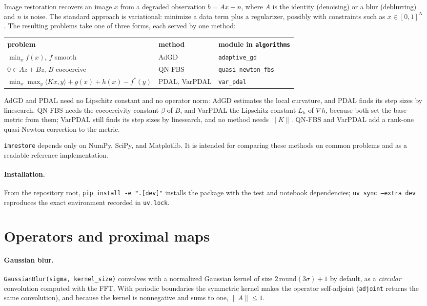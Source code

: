 \documentclass[11pt,a4paper]{article}
\newcommand{\code}[1]{\texttt{#1}}
\begin{document}
Image restoration recovers an image $x$ from a degraded observation
$b = Ax + n$, where $A$ is the identity (denoising) or a blur (deblurring)
and $n$ is noise. The standard approach is variational: minimize a data term
plus a regularizer, possibly with constraints such as $x\in[0,1]^N$. The
resulting problems take one of three forms, each served by one method:
\begin{center}
\begin{tabular}{lll}
\toprule
problem & method & module in \code{algorithms} \\
\midrule
$\min_x f(x)$, $f$ smooth & AdGD & \code{adaptive\_gd} \\
$0\in Az+Bz$, $B$ cocoercive & QN-FBS & \code{quasi\_newton\_fbs} \\
$\min_x\max_y \langle Kx,y\rangle + g(x) + h(x) - f^*(y)$ & PDAL, VarPDAL &
\code{var\_pdal} \\
\bottomrule
\end{tabular}
\end{center}
AdGD and PDAL need no Lipschitz constant and no operator norm: AdGD estimates
the local curvature, and PDAL finds its step sizes by linesearch. QN-FBS needs
the cocoercivity constant $\beta$ of $B$, and VarPDAL the Lipschitz constant
$L_h$ of $\nabla h$, because both set the base metric from them; VarPDAL
still finds its step sizes by linesearch, and no method needs $\|K\|$. QN-FBS
and VarPDAL add a rank-one quasi-Newton correction to the metric.

\texttt{imrestore} depends only on NumPy, SciPy, and Matplotlib. It is
intended for comparing these methods on common problems and as a readable
reference implementation.

\paragraph{Installation.} From the repository root,
\code{pip install -e ".[dev]"} installs the package with the test and
notebook dependencies; \code{uv sync --extra dev} reproduces the exact
environment recorded in \code{uv.lock}.

\section{Operators and proximal maps}

\paragraph{Gaussian blur.} \code{GaussianBlur(sigma, kernel\_size)}
convolves with a normalized Gaussian kernel of size
$2\,\mathrm{round}(3\sigma)+1$ by default, as a \emph{circular} convolution
computed with the FFT. With periodic boundaries the symmetric kernel makes
the operator self-adjoint (\code{adjoint} returns the same convolution), and
because the kernel is nonnegative and sums to one, $\|A\|\le1$.
\end{document}
